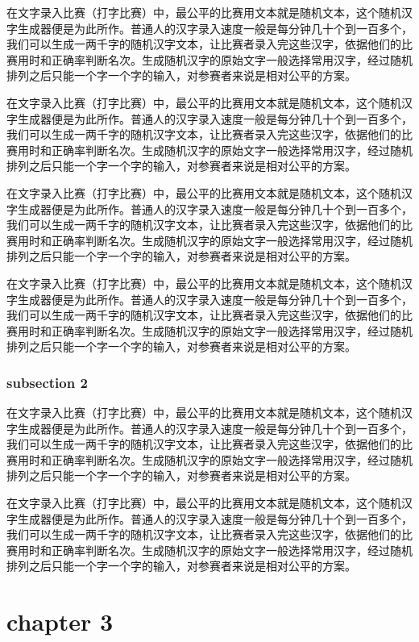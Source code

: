 \documentclass[12pt,hyperref,UTF8]{ctexbook}
\begin{document}
在文字录入比赛（打字比赛）中，最公平的比赛用文本就是随机文本，这个随机汉字生成器便是为此所作。普通人的汉字录入速度一般是每分钟几十个到一百多个，我们可以生成一两千字的随机汉字文本，让比赛者录入完这些汉字，依据他们的比赛用时和正确率判断名次。生成随机汉字的原始文字一般选择常用汉字，经过随机排列之后只能一个字一个字的输入，对参赛者来说是相对公平的方案。

在文字录入比赛（打字比赛）中，最公平的比赛用文本就是随机文本，这个随机汉字生成器便是为此所作。普通人的汉字录入速度一般是每分钟几十个到一百多个，我们可以生成一两千字的随机汉字文本，让比赛者录入完这些汉字，依据他们的比赛用时和正确率判断名次。生成随机汉字的原始文字一般选择常用汉字，经过随机排列之后只能一个字一个字的输入，对参赛者来说是相对公平的方案。

在文字录入比赛（打字比赛）中，最公平的比赛用文本就是随机文本，这个随机汉字生成器便是为此所作。普通人的汉字录入速度一般是每分钟几十个到一百多个，我们可以生成一两千字的随机汉字文本，让比赛者录入完这些汉字，依据他们的比赛用时和正确率判断名次。生成随机汉字的原始文字一般选择常用汉字，经过随机排列之后只能一个字一个字的输入，对参赛者来说是相对公平的方案。

在文字录入比赛（打字比赛）中，最公平的比赛用文本就是随机文本，这个随机汉字生成器便是为此所作。普通人的汉字录入速度一般是每分钟几十个到一百多个，我们可以生成一两千字的随机汉字文本，让比赛者录入完这些汉字，依据他们的比赛用时和正确率判断名次。生成随机汉字的原始文字一般选择常用汉字，经过随机排列之后只能一个字一个字的输入，对参赛者来说是相对公平的方案。

\subsection{subsection 2}

在文字录入比赛（打字比赛）中，最公平的比赛用文本就是随机文本，这个随机汉字生成器便是为此所作。普通人的汉字录入速度一般是每分钟几十个到一百多个，我们可以生成一两千字的随机汉字文本，让比赛者录入完这些汉字，依据他们的比赛用时和正确率判断名次。生成随机汉字的原始文字一般选择常用汉字，经过随机排列之后只能一个字一个字的输入，对参赛者来说是相对公平的方案。

在文字录入比赛（打字比赛）中，最公平的比赛用文本就是随机文本，这个随机汉字生成器便是为此所作。普通人的汉字录入速度一般是每分钟几十个到一百多个，我们可以生成一两千字的随机汉字文本，让比赛者录入完这些汉字，依据他们的比赛用时和正确率判断名次。生成随机汉字的原始文字一般选择常用汉字，经过随机排列之后只能一个字一个字的输入，对参赛者来说是相对公平的方案。

\cleardoublepage
\chapter{chapter 3}
\end{document}
